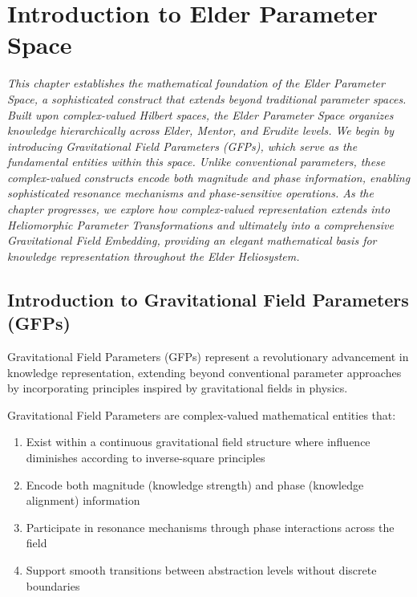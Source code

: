 \chapter{Introduction to Elder Parameter Space}

\textit{This chapter establishes the mathematical foundation of the Elder Parameter Space, a sophisticated construct that extends beyond traditional parameter spaces. Built upon complex-valued Hilbert spaces, the Elder Parameter Space organizes knowledge hierarchically across Elder, Mentor, and Erudite levels. We begin by introducing Gravitational Field Parameters (GFPs), which serve as the fundamental entities within this space. Unlike conventional parameters, these complex-valued constructs encode both magnitude and phase information, enabling sophisticated resonance mechanisms and phase-sensitive operations. As the chapter progresses, we explore how complex-valued representation extends into Heliomorphic Parameter Transformations and ultimately into a comprehensive Gravitational Field Embedding, providing an elegant mathematical basis for knowledge representation throughout the Elder Heliosystem.}

\section{Introduction to Gravitational Field Parameters (GFPs)}

Gravitational Field Parameters (GFPs) represent a revolutionary advancement in knowledge representation, extending beyond conventional parameter approaches by incorporating principles inspired by gravitational fields in physics.

\begin{definition}
Gravitational Field Parameters are complex-valued mathematical entities that:
\begin{enumerate}
    \item Exist within a continuous gravitational field structure where influence diminishes according to inverse-square principles
    \item Encode both magnitude (knowledge strength) and phase (knowledge alignment) information
    \item Participate in resonance mechanisms through phase interactions across the field
    \item Support smooth transitions between abstraction levels without discrete boundaries
\end{enumerate}
\end{definition}

